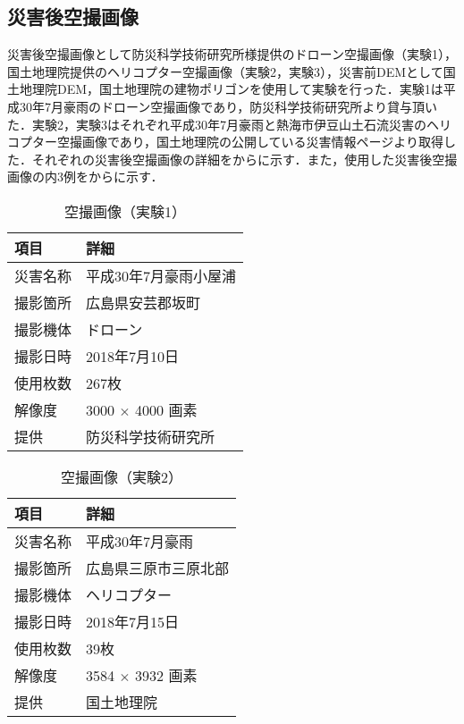     \subsection*{災害後空撮画像}
      災害後空撮画像として防災科学技術研究所様提供のドローン空撮画像\cite{防災科研空撮画像}（実験1），国土地理院提供のヘリコプター空撮画像\cite{国土地理院空撮画像1,国土地理院空撮画像2}（実験2，実験3），災害前DEMとして国土地理院DEM，国土地理院の建物ポリゴンを使用して実験を行った．実験1は平成30年7月豪雨のドローン空撮画像であり，防災科学技術研究所より貸与頂いた．実験2，実験3はそれぞれ平成30年7月豪雨と熱海市伊豆山土石流災害のヘリコプター空撮画像であり，国土地理院の公開している災害情報ページより取得した．それぞれの災害後空撮画像の詳細をからに示す．また，使用した災害後空撮画像の内3例をからに示す．

      \begin{table}[t]
        \centering
        \caption{空撮画像（実験1）}
        \label{空撮画像（実験1）}
        \begin{tabular}{ll}
          \hline
          \textbf{項目} & \textbf{詳細} \\
          \hline \hline
          災害名称 & 平成30年7月豪雨小屋浦 \\
          撮影箇所 & 広島県安芸郡坂町 \\
          撮影機体 & ドローン \\
          撮影日時 & 2018年7月10日 \\
          使用枚数 & 267枚 \\
          解像度 & 3000 $\times$ 4000 画素 \\
          提供 & 防災科学技術研究所 \\ \hline
        \end{tabular}
      \end{table}

      \begin{table}[t]
        \centering
        \caption{空撮画像（実験2）}
        \begin{tabular}{ll}
          \hline
          \textbf{項目} & \textbf{詳細} \\
          \hline \hline
          災害名称 & 平成30年7月豪雨 \\
          撮影箇所 & 広島県三原市三原北部 \\
          撮影機体 & ヘリコプター \\
          撮影日時 & 2018年7月15日 \\
          使用枚数 & 39枚 \\
          解像度 & 3584 $\times$ 3932 画素 \\
          提供 & 国土地理院 \\ \hline
        \end{tabular}
      \end{table}

